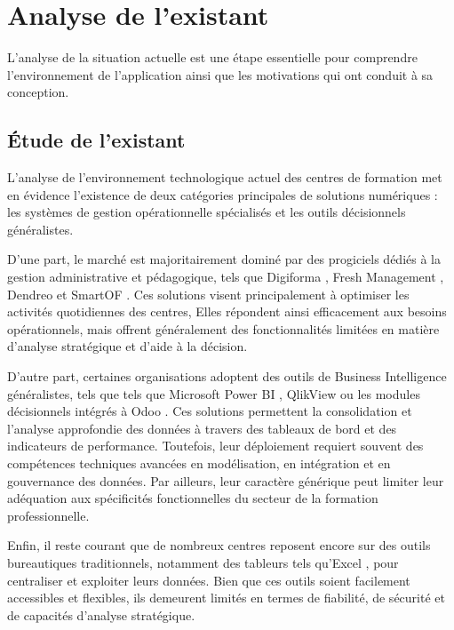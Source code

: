 \section{Analyse de l'existant}
\label{sec:Analyse de l'existant}
L'analyse de la situation actuelle est une étape essentielle pour comprendre l'environnement de l'application ainsi que les motivations qui ont conduit à sa conception.
\subsection{Étude de l'existant}

L’analyse de l’environnement technologique actuel des centres de formation met en évidence l’existence de deux catégories principales de solutions numériques : les systèmes de gestion opérationnelle spécialisés et les outils décisionnels généralistes.

D’une part, le marché est majoritairement dominé par des progiciels dédiés à la gestion administrative et pédagogique, tels que Digiforma \cite{digiforma}, Fresh Management \cite{freshmanagement}, 
Dendreo \cite{dendreo} et SmartOF \cite{smartof}.
 Ces solutions visent principalement à optimiser les activités quotidiennes des centres,  Elles répondent ainsi efficacement aux besoins opérationnels, mais offrent généralement des fonctionnalités limitées en matière d’analyse stratégique et d’aide à la décision.

D’autre part, certaines organisations adoptent des outils de Business Intelligence généralistes, tels que tels que Microsoft Power BI \cite{powerbi}, QlikView \cite{qlikview} 
ou les modules décisionnels intégrés à Odoo \cite{odoo}.
 Ces solutions permettent la consolidation et l’analyse approfondie des données à travers des tableaux de bord et des indicateurs de performance. Toutefois, leur déploiement requiert souvent des compétences techniques avancées en modélisation, en intégration et en gouvernance des données. Par ailleurs, leur caractère générique peut limiter leur adéquation aux spécificités fonctionnelles du secteur de la formation professionnelle.

Enfin, il reste courant que de nombreux centres reposent encore sur des outils bureautiques traditionnels, notamment des tableurs tels qu’Excel \cite{excel}, pour centraliser et exploiter leurs données.  Bien que ces outils soient facilement accessibles et flexibles, ils demeurent limités en termes de fiabilité, de sécurité et de capacités d’analyse stratégique.

